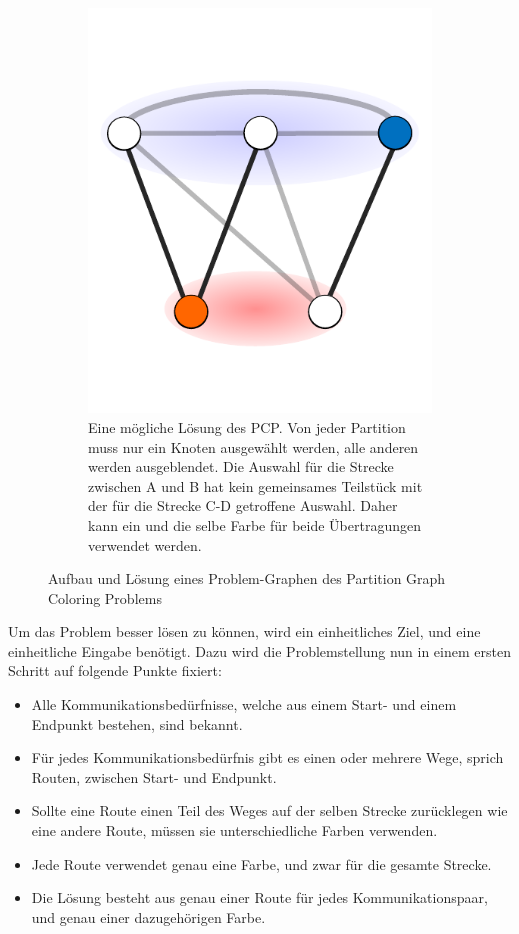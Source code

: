 \begin{figure}
\begin{subfigure}[t]{0.3\textwidth}
		\includegraphics[width=\textwidth]{img/bsp5}
		\caption{Eine mögliche Lösung des PCP\@. Von jeder Partition muss nur ein Knoten ausgewählt werden, alle anderen werden ausgeblendet. Die Auswahl
		für die Strecke zwischen A und B hat kein gemeinsames Teilstück mit der für die Strecke C-D getroffene Auswahl. Daher kann ein und die selbe Farbe
		für beide Übertragungen verwendet werden.}
		\label{fig:example:e}
	\end{subfigure}
	
	\caption{Aufbau und Lösung eines Problem-Graphen des Partition Graph Coloring Problems}
\end{figure}

Um das Problem besser lösen zu können, wird ein einheitliches Ziel, und eine einheitliche Eingabe benötigt.
Dazu wird die Problemstellung nun in einem ersten Schritt auf folgende Punkte fixiert:
\begin{itemize}
	\item Alle Kommunikationsbedürfnisse, welche aus einem Start- und einem Endpunkt bestehen, sind bekannt.
	\item Für jedes Kommunikationsbedürfnis gibt es einen oder mehrere Wege, sprich Routen, zwischen Start- und Endpunkt.
	\item Sollte eine Route einen Teil des Weges auf der selben Strecke zurücklegen wie eine andere Route, müssen sie unterschiedliche Farben verwenden.
	\item Jede Route verwendet genau eine Farbe, und zwar für die gesamte Strecke.
	\item Die Lösung besteht aus genau einer Route für jedes Kommunikationspaar, und genau einer dazugehörigen Farbe.
\end{itemize}

